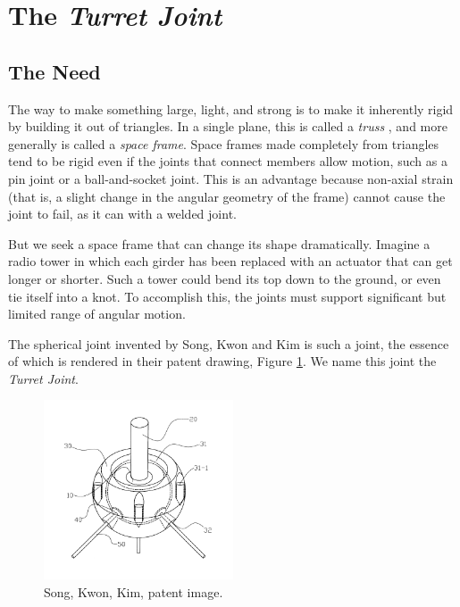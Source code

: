 \documentclass[11pt]{article}
\begin{document}
\section{The \textit{Turret Joint}}

\subsection{The Need}

The way to make something large, light, and strong is to make it inherently rigid by building it
out of triangles. In a single plane, this is called a \emph{truss} \cite{ambrose1993building}, and more generally is called
a \emph{space frame}.  Space frames made completely from triangles tend to be rigid even if the
joints that connect members allow motion, such as a pin joint or a ball-and-socket joint. This
is an advantage because non-axial strain (that is, a slight change in the angular geometry of the frame)
cannot cause
the joint to fail, as it can with a welded joint.

But we seek a space frame that can change its shape dramatically. Imagine a radio tower in which
each girder has been replaced with an actuator that can get longer or shorter. Such a tower could
bend its top down to the ground, or even
tie itself into a knot. To accomplish this, the joints must support significant
but limited range of angular motion. 

The spherical joint invented by Song, Kwon and Kim \cite{song2003spherical} is such a joint,
the essence of which is rendered in their patent drawing, Figure \ref{SongKwonKimImage}.
We name this joint the \emph{Turret Joint}.

\begin{figure}[H]
  \centering
    \includegraphics[width=0.5\textwidth]{figures/SongKwonKimImage.png}
    \caption[Song, Kwon, Kim, patent image.]{Song, Kwon, Kim, patent image.}
      \label{SongKwonKimImage}
\end{figure}
\end{document}
